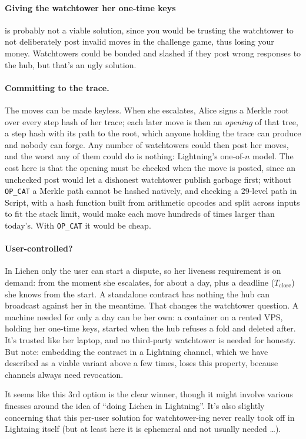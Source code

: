 \documentclass[11pt]{article}
\newcommand{\Tc}{T_{\mathrm{close}}}
\begin{document}
\paragraph{Giving the watchtower her one-time keys} is probably not a viable solution, since you would be trusting the watchtower to not deliberately post invalid moves in the challenge game, thus losing your money. Watchtowers could be bonded and slashed if they post wrong responses to the hub, but that's an ugly solution.

\paragraph{Committing to the trace.} The moves can be made keyless.
When she escalates, Alice signs a Merkle root over every step hash of
her trace; each later move is then an \emph{opening} of that tree, a
step hash with its path to the root, which anyone holding the trace can
produce and nobody can forge. Any number of watchtowers could then post
her moves, and the worst any of them could do is nothing: Lightning's
one-of-$n$ model. The cost here is
that the opening must be checked when the move is posted, since an
unchecked post would let a dishonest watchtower publish garbage first;
without \texttt{OP\_CAT} a Merkle path cannot be hashed natively, and
checking a 29-level path in Script, with a hash function built from
arithmetic opcodes and split across inputs to fit the stack limit,
would make each move hundreds of times larger than today's. With
\texttt{OP\_CAT} it would be cheap.

\paragraph{User-controlled?} In Lichen only the user can start a dispute, so her liveness requirement is on demand: from the moment she escalates, for about a day, plus a deadline ($\Tc$) she knows from the start. A standalone contract has nothing the hub can broadcast against her in the meantime. That changes the watchtower question. A machine needed for only a day can be her own: a container on a rented VPS, holding her one-time keys, started when the hub refuses a fold and deleted after. It's trusted like her laptop, and no third-party watchtower is needed for honesty. But note: embedding the contract in a Lightning channel, which we have described as a viable variant above a few times, loses this property, because channels always need revocation.

It seems like this 3rd option is the clear winner, though it might involve various finesses around the idea of ``doing Lichen in Lightning''. It's also slightly concerning that this per-user solution for watchtower-ing never really took off in Lightning itself (but at least here it is ephemeral and not usually needed \ldots).
\end{document}
